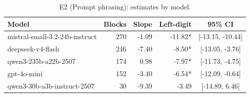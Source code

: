 \begin{table}[t]
\centering
\caption{E2 (Prompt phrasing): estimates by model.}
\label{tab:e2model}
\small
\begin{tabular}{lrrrc}
\toprule
Model & Blocks & Slope & Left-digit & 95\% CI \\
\midrule
mistral-small-3.2-24b-instruct & 270 & -1.09 & -11.82* & [-13.15, -10.44] \\
deepseek-v4-flash & 246 & -7.40 & -8.50* & [-13.05, -3.76] \\
qwen3-235b-a22b-2507 & 174 & 0.98 & -7.97* & [-11.73, -4.75] \\
gpt-4o-mini & 152 & -3.40 & -6.54* & [-12.09, -0.64] \\
qwen3-30b-a3b-instruct-2507 &  30 & -9.39 & -3.49 & [-14.89, 6.46] \\
\bottomrule
\end{tabular}
\end{table}
